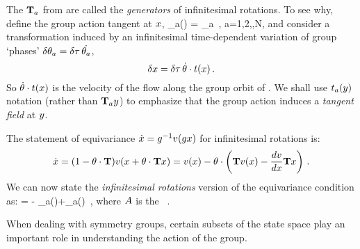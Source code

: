 {The $\mathbf{T}_a$ from  are called the \emph{generators} of infinitesimal rotations. To see why, define the group action tangent at $x$,
\beq
 \groupTan_{a}(\ssp) = \Lg _{a} \ssp
    \,,\qquad
 a=1,2,\cdots,N,
and consider a transformation induced by an infinitesimal
time-dependent variation of group `phases'
$\delta \gSpace_a = \timeStep \, \dot{\gSpace_a}$,
\[
\delta \ssp = \timeStep \, \dot{\gSpace} \cdot \groupTan(\ssp)
\,.
\]
So $\dot{{\bf \theta}} \cdot t(x)$ is the velocity
of the flow along the group orbit of \ssp.
We shall use $t_a(y)$ notation (rather than
$\mathbf{T}_{a}y$) to emphasize that the group action
induces a \emph{tangent field} at $y$.

The statement of equivariance
$
\dot{x}=g^{-1} v(g x)
$
for infinitesimal rotations is:
\[
\dot{x}=(1-{\bf \theta} \cdot \mathbf{T} ) v(x+{\bf \theta} \cdot \mathbf{T}  x)
       =v(x)-{\bf \theta} \cdot \left(
            \mathbf{T} v(x) - \frac{dv}{dx} \mathbf{T} x
                     \right)
\,.
\]
We can now state the {\em infinitesimal
rotations} version of the equivariance condition
 as:
 = - \groupTan_{a}(\vel)+\Mvar \groupTan_{a}(\ssp)
\,,
\label{eq:InfnmslRot}
\eeq
where $A$ is the \stabmat\ .


When dealing with symmetry groups, certain subsets of the state space play an important role in understanding the action of the group.

}
